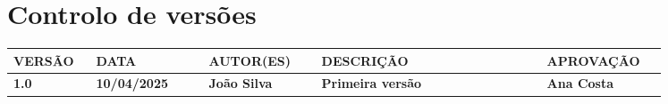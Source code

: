 \setlength{\headheight}{61.22015pt}
\addtolength{\topmargin}{-11.22015pt}
\newpage
\thispagestyle{otherpages}

\vspace*{3cm}
\section*{Controlo de versões}

\small
\begin{tabular}{| >{\centering\arraybackslash}p{0.1\linewidth} | >{\centering\arraybackslash}p{0.15\linewidth} | >{\centering\arraybackslash}p{0.15\linewidth} | >{\centering\arraybackslash}p{0.3\linewidth} | >{\centering\arraybackslash}p{0.15\linewidth} |}
    \hline
    VERSÃO & DATA & AUTOR(ES) & DESCRIÇÃO & APROVAÇÃO \\
    \hline
    \textbf{1.0} & \textbf{10/04/2025} & \textbf{João Silva} & \textbf{Primeira versão} & \textbf{Ana Costa} \\
    \hline
\end{tabular}
